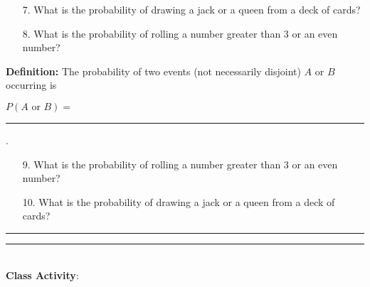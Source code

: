 \documentclass[oneside]{amsart}
\makeatletter
\def\vhrulefill#1{\leavevmode\leaders\hrule\@height#1\hfill \kern\z@}
\theoremstyle{definition}
\theoremstyle{definition}
\makeatother
\begin{document}
\begin{itemize}
    
   \item[7.] What is the probability of drawing a jack or a queen from a deck of cards?

   \vfill
    
    \item[8.] What is the probability of rolling a number greater than 3 or an even number?
    
    \vfill
    
\end{itemize}

\begin{ovalbox}{\begin{minipage}{6.8in}
\vspace{5mm}

\textbf{Definition:} The probability of two events (not necessarily disjoint) $A$ or $B$ occurring is  \\
\begin{center}
  $P(A \text{ or } B)= $\rule[-2mm]{35mm}{.1mm}.
\end{center}

\vspace{7mm}

\end{minipage}}
\end{ovalbox}

\begin{itemize}

    \item[9.] What is the probability of rolling a number greater than 3 or an even number?
    
    \vfill
    
   \item[10.] What is the probability of drawing a jack or a queen from a deck of cards?

   \vfill
    
\end{itemize}

\newpage

\vhrulefill{2pt}

\vspace{1mm}
\vhrulefill{2pt}
\\

{\Large \textbf{ Class Activity}:}
\\
\end{document}
